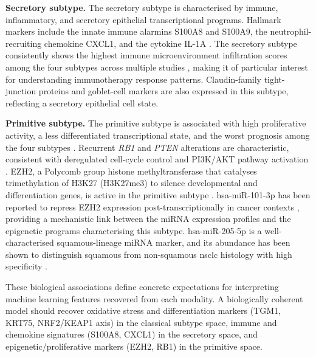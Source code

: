 \textbf{Secretory subtype.}
The secretory subtype is characterised by immune, inflammatory, and secretory epithelial transcriptional programs. Hallmark markers include the innate immune alarmins S100A8 and S100A9, the neutrophil-recruiting chemokine CXCL1, and the cytokine IL-1A \parencite{Wilkerson2010}. The secretory subtype consistently shows the highest immune microenvironment infiltration scores among the four subtypes across multiple studies \parencite{Yang2022immune, Wilkerson2010}, making it of particular interest for understanding immunotherapy response patterns. Claudin-family tight-junction proteins and goblet-cell markers are also expressed in this subtype, reflecting a secretory epithelial cell state.
 
\textbf{Primitive subtype.}
The primitive subtype is associated with high proliferative activity, a less differentiated transcriptional state, and the worst prognosis among the four subtypes \parencite{Wilkerson2010, Hammerman2012}. Recurrent \textit{RB1} and \textit{PTEN} alterations are characteristic, consistent with deregulated cell-cycle control and PI3K/AKT pathway
activation \parencite{Hammerman2012}. EZH2, a Polycomb group histone methyltransferase that catalyses trimethylation of H3K27 (H3K27me3) to silence developmental and differentiation genes, is active in the primitive subtype \parencite{Varambally2008}. hsa-miR-101-3p has been reported to repress EZH2 expression post-transcriptionally in cancer contexts \parencite{Varambally2008, Montani2024}, providing a mechanistic link between the miRNA expression profiles and the epigenetic programs characterising this subtype. hsa-miR-205-5p is a well-characterised squamous-lineage miRNA marker, and its abundance has been shown to distinguish squamous from non-squamous \gls{nsclc} histology with high specificity \parencite{Lebanony2009}.
 
These biological associations define concrete expectations for interpreting machine learning features recovered from each modality. A biologically coherent model should recover oxidative stress and differentiation markers (TGM1, KRT75, NRF2/KEAP1 axis) in the classical subtype space, immune and chemokine signatures (S100A8, CXCL1) in the secretory space, and epigenetic/proliferative markers (EZH2, RB1) in the primitive space. 
